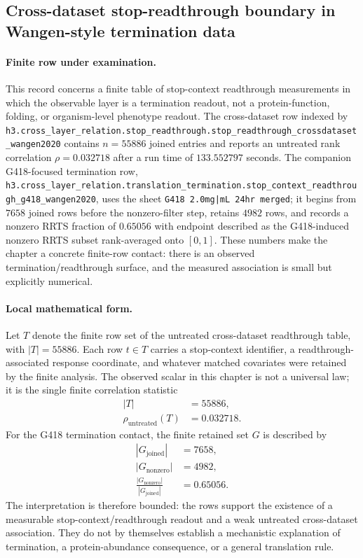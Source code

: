 
\subsection{Cross-dataset stop-readthrough boundary in Wangen-style termination data}
\label{sec:bioreality-stop-readthrough-crossdataset-wangen2020}

\paragraph{Finite row under examination.}
This record concerns a finite table of stop-context readthrough measurements in which the observable layer is a termination readout, not a protein-function, folding, or organism-level phenotype readout.  The cross-dataset row indexed by \texttt{h3.cross\_layer\_relation.stop\_readthrough.stop\_readthrough\_crossdataset\_wangen2020} contains $n=55886$ joined entries and reports an untreated rank correlation
$\rho=0.032718$ after a run time of $133.552797$ seconds.  The companion G418-focused termination row, \texttt{h3.cross\_layer\_relation.translation\_termination.stop\_context\_readthrough\_g418\_wangen2020}, uses the sheet \texttt{G418 2.0mg|mL 24hr merged}; it begins from $7658$ joined rows before the nonzero-filter step, retains $4982$ rows, and records a nonzero RRTS fraction of $0.65056$ with endpoint described as the G418-induced nonzero RRTS subset rank-averaged onto $[0,1]$.  These numbers make the chapter a concrete finite-row contact: there is an observed termination/readthrough surface, and the measured association is small but explicitly numerical.

\paragraph{Local mathematical form.}
Let $T$ denote the finite row set of the untreated cross-dataset readthrough table, with $|T|=55886$.  Each row $t\in T$ carries a stop-context identifier, a readthrough-associated response coordinate, and whatever matched covariates were retained by the finite analysis.  The observed scalar in this chapter is not a universal law; it is the single finite correlation statistic
$$
\begin{aligned}
|T| &= 55886,\\
\rho_{\mathrm{untreated}}(T) &= 0.032718.
\end{aligned}
$$
For the G418 termination contact, the finite retained set $G$ is described by
$$
\begin{aligned}
|G_{\mathrm{joined}}| &= 7658,\\
|G_{\mathrm{nonzero}}| &= 4982,\\
\frac{|G_{\mathrm{nonzero}}|}{|G_{\mathrm{joined}}|} &= 0.65056.
\end{aligned}
$$
The interpretation is therefore bounded: the rows support the existence of a measurable stop-context/readthrough readout and a weak untreated cross-dataset association.  They do not by themselves establish a mechanistic explanation of termination, a protein-abundance consequence, or a general translation rule.

